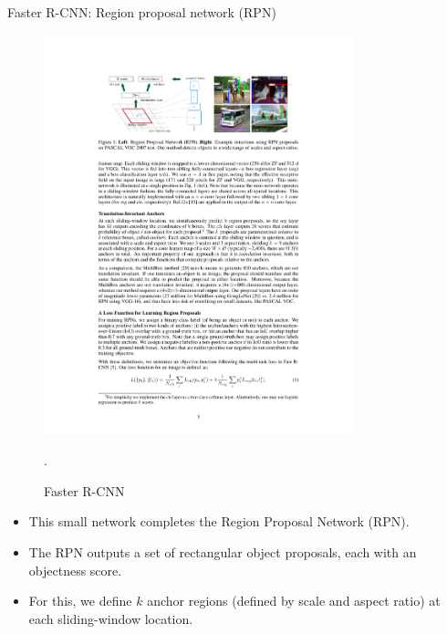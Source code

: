 \documentclass[xcolor=pdftex,dvipsnames,table]{beamer}
\begin{document}
\begin{frame}{Faster R-CNN: Region proposal network (RPN)}
\begin{figure}[htb]
   \centering
   \includegraphics[width=0.8\textwidth]{../graphics/Faster_R-CNN.pdf}
   \caption{Faster R-CNN \cite{Ren2017}}.
\end{figure}
\begin{itemize}
\item This small network completes the Region Proposal Network (RPN).
\item The RPN outputs a set of rectangular object proposals, each with an objectness score.
\item For this, we define $k$ anchor regions (defined by scale and aspect ratio) at each sliding-window location.
\end{itemize}
\end{frame}
\end{document}
